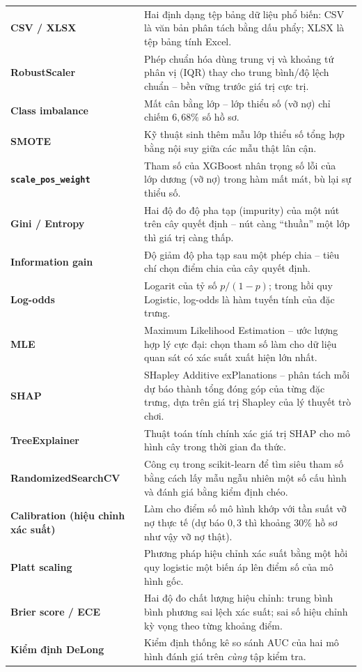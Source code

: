 \documentclass[12pt,a4paper,oneside]{report}
\theoremstyle{vnplain}
\theoremstyle{vndef}
\begin{document}
\begin{longtable}{>{\raggedright\arraybackslash\bfseries}p{4.1cm} p{10.1cm}}
CSV / XLSX & Hai định dạng tệp bảng dữ liệu phổ biến: CSV là văn bản phân tách bằng dấu phẩy; XLSX là tệp bảng tính Excel.\\
RobustScaler & Phép chuẩn hóa dùng trung vị và khoảng tứ phân vị (IQR) thay cho trung bình/độ lệch chuẩn -- bền vững trước giá trị cực trị.\\
Class imbalance & Mất cân bằng lớp -- lớp thiểu số (vỡ nợ) chỉ chiếm $6{,}68\%$ số hồ sơ.\\
SMOTE & Kỹ thuật sinh thêm mẫu lớp thiểu số tổng hợp bằng nội suy giữa các mẫu thật lân cận.\\
\texttt{scale\_pos\_weight} & Tham số của XGBoost nhân trọng số lỗi của lớp dương (vỡ nợ) trong hàm mất mát, bù lại sự thiểu số.\\
Gini / Entropy & Hai độ đo độ pha tạp (impurity) của một nút trên cây quyết định -- nút càng ``thuần'' một lớp thì giá trị càng thấp.\\
Information gain & Độ giảm độ pha tạp sau một phép chia -- tiêu chí chọn điểm chia của cây quyết định.\\
Log-odds & Logarit của tỷ số $p/(1-p)$; trong hồi quy Logistic, log-odds là hàm tuyến tính của đặc trưng.\\
MLE & Maximum Likelihood Estimation -- ước lượng hợp lý cực đại: chọn tham số làm cho dữ liệu quan sát có xác suất xuất hiện lớn nhất.\\
SHAP & SHapley Additive exPlanations -- phân tách mỗi dự báo thành tổng đóng góp của từng đặc trưng, dựa trên giá trị Shapley của lý thuyết trò chơi.\\
TreeExplainer & Thuật toán tính chính xác giá trị SHAP cho mô hình cây trong thời gian đa thức.\\
RandomizedSearchCV & Công cụ trong scikit-learn để tìm siêu tham số bằng cách lấy mẫu ngẫu nhiên một số cấu hình và đánh giá bằng kiểm định chéo.\\
Calibration (hiệu chỉnh xác suất) & Làm cho điểm số mô hình khớp với tần suất vỡ nợ thực tế (dự báo $0{,}3$ thì khoảng $30\%$ hồ sơ như vậy vỡ nợ thật).\\
Platt scaling & Phương pháp hiệu chỉnh xác suất bằng một hồi quy logistic một biến áp lên điểm số của mô hình gốc.\\
Brier score / ECE & Hai độ đo chất lượng hiệu chỉnh: trung bình bình phương sai lệch xác suất; sai số hiệu chỉnh kỳ vọng theo từng khoảng điểm.\\
Kiểm định DeLong & Kiểm định thống kê so sánh AUC của hai mô hình đánh giá trên \emph{cùng} tập kiểm tra.\\

\end{longtable}
\end{document}
